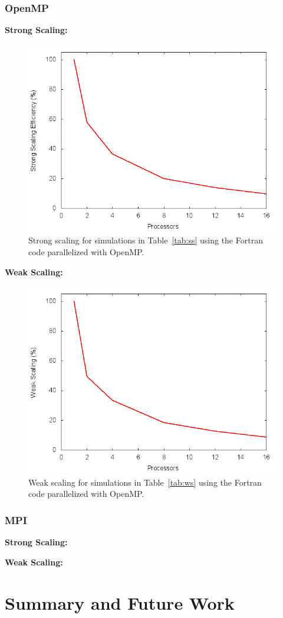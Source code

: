 \documentclass{scrartcl}
\begin{document}
  \subsubsection{OpenMP}
  \textbf{Strong Scaling:}
  \begin{figure}
  	\begin{center}
	  	\includegraphics[width=0.7\columnwidth]{./fort_scaling/ss.png}
	  	\caption{Strong scaling for simulations in Table~\ref{tab:ss} using the Fortran code parallelized with OpenMP.}
		\label{fig:ss_fort_omp}
  	\end{center}
  \end{figure}
  
  
  \textbf{Weak Scaling:}  
    \begin{figure}
    	\begin{center}
    		\includegraphics[width=0.7\columnwidth]{./fort_scaling/ws.png}
    		\caption{Weak scaling for simulations in Table~\ref{tab:ws} using the Fortran code parallelized with OpenMP.}
    		\label{fig:ws_fort_omp}
    	\end{center}
    \end{figure}
  
  \subsubsection{MPI}
  \textbf{Strong Scaling:}
  
  \textbf{Weak Scaling:}

	
  \section{Summary and Future Work}
\end{document}
